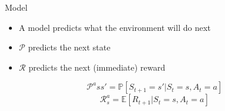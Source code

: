 \bgroup
\begin{frame}{Model}
\begin{itemize}
\item A \textcolor{mImagelabRed}{model} predicts what the environment will do next
\item $\mathcal{P}$ predicts the next state
\item $\mathcal{R}$ predicts the next (immediate) reward
\end{itemize}
\begin{equation*}
\mathcal{P}^a{ss'}=\mathbb{P}[S_{t+1}=s'| S_t=s, A_t=a]
\end{equation*}
\begin{equation*}
\mathcal{R}^a_s = \mathbb{E}[R_{t+1}|S_t=s, A_t=a]
\end{equation*}
\end{frame}
\egroup